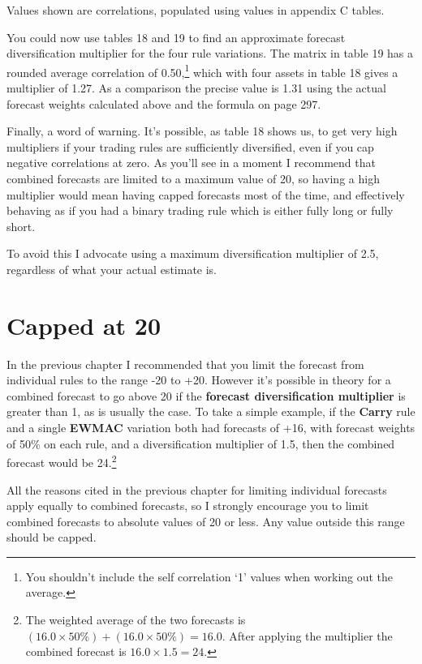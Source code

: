 Values shown are correlations, populated using values in appendix C tables.

You could now use tables 18 and 19 to find an approximate forecast diversification multiplier for the four rule variations. The matrix in table 19 has a rounded average correlation of 0.50,\footnote{You shouldn’t include the self correlation ‘1’ values when working out the average.} which with four assets in table 18 gives a multiplier of 1.27. As a comparison the precise value is 1.31 using the actual forecast weights calculated above and the formula on page 297.

Finally, a word of warning. It’s possible, as table 18 shows us, to get very high multipliers if your trading rules are sufficiently diversified, even if you cap negative correlations at zero. As you’ll see in a moment I recommend that combined forecasts are limited to a maximum value of 20, so having a high multiplier would mean having capped forecasts most of the time, and effectively behaving as if you had a binary trading rule which is either fully long or fully short.

To avoid this I advocate using a maximum diversification multiplier of 2.5, regardless of what your actual estimate is.

\section*{Capped at 20}  {}

In the previous chapter I recommended that you limit the forecast from individual rules to the range -20 to +20. However it's possible in theory for a combined forecast to go above 20 if the \textbf{forecast diversification multiplier} is greater than 1, as is usually the case. To take a simple example, if the \textbf{Carry} rule and a single \textbf{EWMAC} variation both had forecasts of +16, with forecast weights of 50\% on each rule, and a diversification multiplier of 1.5, then the combined forecast would be 24.\footnote{The weighted average of the two forecasts is \((16.0 \times 50\%) + (16.0 \times 50\%) = 16.0\). After applying the multiplier the combined forecast is \(16.0 \times 1.5 = 24\).}

All the reasons cited in the previous chapter for limiting individual forecasts apply equally to combined forecasts, so I strongly encourage you to limit combined forecasts to absolute values of 20 or less. Any value outside this range should be capped.

